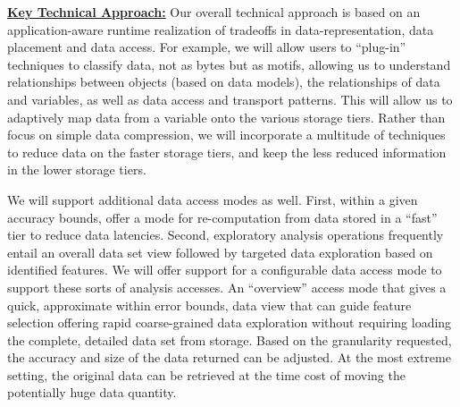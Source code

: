\documentclass[11pt,letterpaper]{article}
\begin{document}
\underline{\textbf{Key Technical Approach:}}
Our overall technical approach is based on an application-aware runtime realization of tradeoffs in 
data-representation, data placement and data access. For example, we will allow users to ``plug-in'' 
techniques to classify data, not as bytes but as motifs, allowing us to understand relationships 
between objects (based on data models), the relationships of data and variables, as well as data
access and transport patterns.  This will allow us 
to adaptively map data from a variable onto the various storage tiers. Rather than focus on simple data
compression, we will incorporate a multitude of techniques to reduce data on the faster storage tiers, and keep the less
reduced information in the lower storage tiers.

We will support additional data access modes as well. First, within a given
accuracy bounds, offer a mode for re-computation from data stored in a ``fast''
tier to reduce data latencies. Second, exploratory analysis operations
frequently entail an overall data set view followed by targeted data
exploration based on identified features. We will offer support for a
configurable data access mode to support these sorts of analysis accesses. An
``overview'' access mode that gives a quick, approximate within error bounds,
data view that can guide feature selection offering rapid coarse-grained data
exploration without requiring loading the complete, detailed data set from
storage. Based on the granularity requested, the accuracy and size of the data
returned can be adjusted. At the most extreme setting, the original data can
be retrieved at the time cost of moving the potentially huge data quantity.
\end{document}
